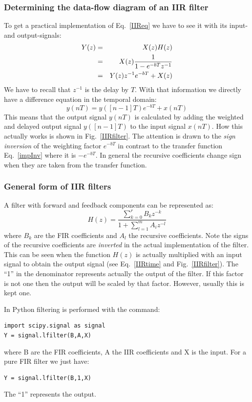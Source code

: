 \documentclass[12pt,a4paper]{article}
\begin{document}
\subsubsection{Determining the data-flow diagram of an IIR filter}
To get a practical implementation of Eq.~\ref{IIReq} we have
to see it with its input- and output-signals:
\begin{eqnarray}
Y(z)&=&X(z)H(z)\\
    &=&X(z) {1\over 1-e^{-bT} z^{-1}} \\
    &=&Y(z)z^{-1}e^{-bT}+X(z)
\label{Verg}
\end{eqnarray}
We have to recall that $z^{-1}$ is the delay by $T$. With that
information we directly have a difference equation in the
temporal domain:
\begin{equation}
y(nT)=y([n-1]T) e^{-bT} + x(nT)
\label{IIRtime}
\end{equation}
This means that the output signal $y(nT)$ is calculated by
adding the weighted and delayed output signal $y([n-1]T)$ 
to the input signal $x(nT)$.
How this actually works is shown in Fig.~\ref{IIRfilter}.
The attention is drawn to the \textsl{sign inversion} of the weighting
factor $e^{-bT}$ in contrast to the transfer function 
Eq.~\ref{impInv} where it is $-e^{-bT}$. In general the recursive
coefficients change sign when they are taken from the transfer
function.



\subsubsection{General form of IIR filters}
A filter with forward and feedback components can be represented as:
\begin{equation} 
H(z) = \frac{\sum_{k = 0}^{r} B_{k} z^{-k}}{1 + \sum_{l = 1}^{m} A_{i} z^{-l}} \end{equation}
where $B_k$ are the FIR coefficients and $A_l$ the recursive coefficients.
Note the signs of the recursive coefficients are \textsl{inverted} in the
actual implementation of the filter. This can be seen when the
function $H(z)$ is actually multiplied with an input signal to
obtain the output signal (see Eq.~\ref{IIRtime} and Fig.~\ref{IIRfilter}).
The ``1'' in the denominator represents actually the output of
the filter. If this factor is not one then the output will be scaled
by that factor. However, usually this is kept one.

In Python filtering is performed with the command:
\begin{verbatim}
import scipy.signal as signal
Y = signal.lfilter(B,A,X)
\end{verbatim}
where B are the FIR coefficients, A the IIR coefficients and X is the input.
For a pure FIR filter we just have:
\begin{verbatim}
Y = signal.lfilter(B,1,X)
\end{verbatim}
The ``1'' represents the output.
\end{document}
